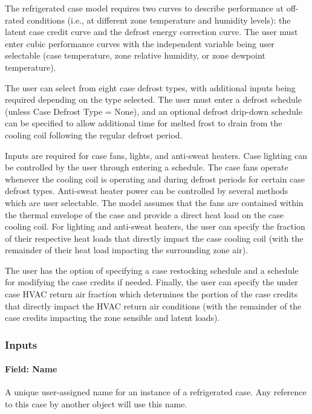 The refrigerated case model requires two curves to describe performance at off-rated conditions (i.e., at different zone temperature and humidity levels): the latent case credit curve and the defrost energy correction curve. The user must enter cubic performance curves with the independent variable being user selectable (case temperature, zone relative humidity, or zone dewpoint temperature).

The user can select from eight case defrost types, with additional inputs being required depending on the type selected. The user must enter a defrost schedule (unless Case Defrost Type = None), and an optional defrost drip-down schedule can be specified to allow additional time for melted frost to drain from the cooling coil following the regular defrost period.

Inputs are required for case fans, lights, and anti-sweat heaters. Case lighting can be controlled by the user through entering a schedule. The case fans operate whenever the cooling coil is operating and during defrost periods for certain case defrost types. Anti-sweat heater power can be controlled by several methods which are user selectable. The model assumes that the fans are contained within the thermal envelope of the case and provide a direct heat load on the case cooling coil. For lighting and anti-sweat heaters, the user can specify the fraction of their respective heat loads that directly impact the case cooling coil (with the remainder of their heat load impacting the surrounding zone air).

The user has the option of specifying a case restocking schedule and a schedule for modifying the case credits if needed. Finally, the user can specify the under case HVAC return air fraction which determines the portion of the case credits that directly impact the HVAC return air conditions (with the remainder of the case credits impacting the zone sensible and latent loads).

\subsubsection{Inputs}\label{inputs-1-036}

\paragraph{Field: Name}\label{field-name-1-035}

A unique user-assigned name for an instance of a refrigerated case. Any reference to this case by another object will use this name.

